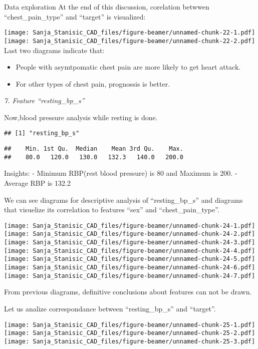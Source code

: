 \documentclass[
  ignorenonframetext,
]{beamer}
\begin{document}
\begin{frame}[fragile]{Data exploration}
At the end of this discussion, corelation betwwen ``chest\_pain\_type''
and ``target'' is visualized:

\texttt{[image: Sanja\_Stanisic\_CAD\_files/figure-beamer/unnamed-chunk-22-1.pdf]}
\texttt{[image: Sanja\_Stanisic\_CAD\_files/figure-beamer/unnamed-chunk-22-2.pdf]}
Last two diagrams indicate that:

\begin{itemize}
\item
  People with asymtpomatic chest pain are more likely to get heart
  attack.
\item
  For other types of chest pain, prognossis is better.
\end{itemize}

\emph{7. Feature ``resting\_bp\_s''}

Now,blood pressure analysis while resting is done.

\begin{verbatim}
## [1] "resting_bp_s"
\end{verbatim}

\begin{verbatim}
##    Min. 1st Qu.  Median    Mean 3rd Qu.    Max. 
##    80.0   120.0   130.0   132.3   140.0   200.0
\end{verbatim}

Insights: - Minimum RBP(rest blood pressure) is 80 and Maximum is 200. -
Average RBP is 132.2

We can see diagrams for descriptive analysis of ``resting\_bp\_s'' and
diagrams that visuelize its correlation to features ``sex'' and
``chest\_pain\_type''.

\texttt{[image: Sanja\_Stanisic\_CAD\_files/figure-beamer/unnamed-chunk-24-1.pdf]}
\texttt{[image: Sanja\_Stanisic\_CAD\_files/figure-beamer/unnamed-chunk-24-2.pdf]}
\texttt{[image: Sanja\_Stanisic\_CAD\_files/figure-beamer/unnamed-chunk-24-3.pdf]}
\texttt{[image: Sanja\_Stanisic\_CAD\_files/figure-beamer/unnamed-chunk-24-4.pdf]}
\texttt{[image: Sanja\_Stanisic\_CAD\_files/figure-beamer/unnamed-chunk-24-5.pdf]}
\texttt{[image: Sanja\_Stanisic\_CAD\_files/figure-beamer/unnamed-chunk-24-6.pdf]}
\texttt{[image: Sanja\_Stanisic\_CAD\_files/figure-beamer/unnamed-chunk-24-7.pdf]}

From previous diagrams, definitive conclusions about features can not be
drawn.

Let us analize correspondance between ``resting\_bp\_s'' and ``target''.

\texttt{[image: Sanja\_Stanisic\_CAD\_files/figure-beamer/unnamed-chunk-25-1.pdf]}
\texttt{[image: Sanja\_Stanisic\_CAD\_files/figure-beamer/unnamed-chunk-25-2.pdf]}
\texttt{[image: Sanja\_Stanisic\_CAD\_files/figure-beamer/unnamed-chunk-25-3.pdf]}


\end{frame}
\end{document}
